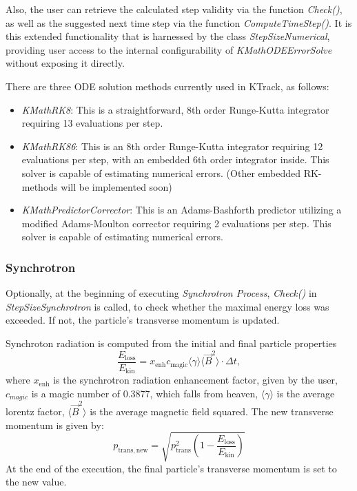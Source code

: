         Also, the user can retrieve the calculated step validity via the function \textit{Check()}, as well as the suggested next time step via the function \textit{ComputeTimeStep()}.  It is this extended functionality that is harnessed by the class \textit{StepSizeNumerical}, providing user access to the internal configurability of \textit{KMathODEErrorSolve} without exposing it directly.
        
        There are three ODE solution methods currently used in KTrack, as follows:
        
        \begin{itemize}
            \item \textit{KMathRK8}:  This is a straightforward, 8th order Runge-Kutta integrator requiring 13 evaluations per step\cite{RK8}.
            \item \textit{KMathRK86}:  This is an 8th order Runge-Kutta integrator requiring 12 evaluations per step, with an embedded 6th order integrator inside\cite{Barrett2010}.  This solver is capable of estimating numerical errors. (Other embedded RK-methods will be implemented soon)            
            \item \textit{KMathPredictorCorrector}:  This is an Adams-Bashforth predictor utilizing a modified Adams-Moulton corrector requiring 2 evaluations per step\cite{Faust2008}.  This solver is capable of estimating numerical errors.  
        \end{itemize}

        
    \subsubsection*{Synchrotron}
    Optionally, at the beginning of executing \textit{Synchrotron Process}, \textit{Check()} in \textit{StepSizeSynchrotron} is called, to check whether the maximal energy loss was exceeded. If not, the particle's transverse momentum is updated. 
    
    Synchroton radiation is computed from the initial and final particle properties 
    \begin{equation}
        \frac{E_{\mathrm{loss}}}{E_{\mathrm{kin}}} = x_{\mathrm{enh}} c_{\mathrm{magic}} \langle \gamma \rangle \langle \vec{B}^2 \rangle \cdot \Delta t,
    \end{equation}
        where $x_{\mathrm{enh}}$ is the synchrotron radiation enhancement factor, given by the user, $c_{magic}$ is a magic number of 0.3877, which falls from heaven, $\langle \gamma \rangle$  is the average lorentz factor, $\langle \vec{B}^2 \rangle$ is the average magnetic field squared.
        The new transverse momentum is given by:
    \begin{equation}
        p_{\mathrm{trans,new}} = \sqrt{p_{\mathrm{trans}}^2 (1 - \frac{E_{\mathrm{loss}}}{E_{\mathrm{kin}}})}
    \end{equation}  
    At the end of the execution, the final particle's transverse momentum is set to the new value. 
    

